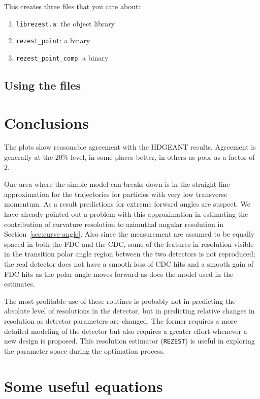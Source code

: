 \documentclass{article}
\begin{document}
This creates three files that you care about:

\begin{enumerate}
\item {\tt librezest.a}: the object library
\item {\tt rezest\_point}: a binary
\item {\tt rezest\_point\_comp}: a binary
\end{enumerate}

\subsection{Using the files}

\section{Conclusions}

The plots show reasonable agreement with the HDGEANT
results. Agreement is generally at the 20\% level, in some places
better, in others as poor as a factor of 2.

One area where the simple model can breaks down is in the
straight-line approximation for the trajectories for particles with
very low transverse momentum. As a result predictions for extreme
forward angles are suspect. We have already pointed out a problem with
this approximation in estimating the contribution of curvature
resolution to azimuthal angular resolution in
Section~\ref{sec:curve-angle}.  Also since the measurement are assumed
to be equally spaced in both the FDC and the CDC, some of the features
in resolution visible in the transition polar angle region between the
two detectors is not reproduced; the real detector does not have a
smooth loss of CDC hits and a smooth gain of FDC hits as the polar
angle moves forward as does the model used in the estimates.

The most profitable use of these routines is probably not in
predicting the absolute level of resolutions in the detector, but in
predicting relative changes in resolution as detector parameters are
changed. The former requires a more detailed modeling of the detector
but also requires a greater effort whenever a new design is
proposed. This resolution estimator ({\tt REZEST}) is useful in
exploring the parameter space during the optimation process.

\appendix

\section{Some useful equations}\label{app:algebra}



\end{document}

